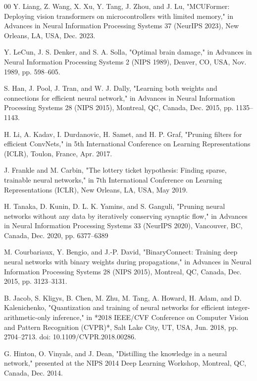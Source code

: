 \documentclass[conference]{IEEEtran}
\begin{document}
\begin{thebibliography}{00}
		Y. Liang, Z. Wang, X. Xu, Y. Tang, J. Zhou, and J. Lu, "MCUFormer: Deploying vision transformers on microcontrollers with limited memory," in Advances in Neural Information Processing Systems 37 (NeurIPS 2023), New Orleans, LA, USA, Dec. 2023.
		
		Y. LeCun, J. S. Denker, and S. A. Solla, "Optimal brain damage," in Advances in Neural Information Processing Systems 2 (NIPS 1989), Denver, CO, USA, Nov. 1989, pp. 598–605.
		
		S. Han, J. Pool, J. Tran, and W. J. Dally, "Learning both weights and connections for efficient neural network," in Advances in Neural Information Processing Systems 28 (NIPS 2015), Montreal, QC, Canada, Dec. 2015, pp. 1135–1143.
		
		H. Li, A. Kadav, I. Durdanovic, H. Samet, and H. P. Graf, "Pruning filters for efficient ConvNets," in 5th International Conference on Learning Representations (ICLR), Toulon, France, Apr. 2017.
		
		J. Frankle and M. Carbin, "The lottery ticket hypothesis: Finding sparse, trainable neural networks," in 7th International Conference on Learning Representations (ICLR), New Orleans, LA, USA, May 2019.
		
		H. Tanaka, D. Kunin, D. L. K. Yamins, and S. Ganguli, "Pruning neural networks without any data by iteratively conserving synaptic flow," in Advances in Neural Information Processing Systems 33 (NeurIPS 2020), Vancouver, BC, Canada, Dec. 2020, pp. 6377–6389
		
		M. Courbariaux, Y. Bengio, and J.-P. David, "BinaryConnect: Training deep neural networks with binary weights during propagations," in Advances in Neural Information Processing Systems 28 (NIPS 2015), Montreal, QC, Canada, Dec. 2015, pp. 3123–3131.
		
		B. Jacob, S. Kligys, B. Chen, M. Zhu, M. Tang, A. Howard, H. Adam, and D. Kalenichenko, "Quantization and training of neural networks for efficient integer-arithmetic-only inference," in *2018 IEEE/CVF Conference on Computer Vision and Pattern Recognition (CVPR)*, Salt Lake City, UT, USA, Jun. 2018, pp. 2704–2713. doi: 10.1109/CVPR.2018.00286.
		
		G. Hinton, O. Vinyals, and J. Dean, "Distilling the knowledge in a neural network," presented at the NIPS 2014 Deep Learning Workshop, Montreal, QC, Canada, Dec. 2014.
		

\end{thebibliography}
\end{document}
